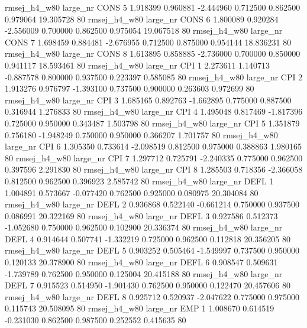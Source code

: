 rmsej_h4_w80   large_nr     CONS                 5  1.918399  0.960881  -2.444960 0.712500 0.862500  0.979064   19.305728 80
rmsej_h4_w80   large_nr     CONS                 6  1.800089  0.920284  -2.556009 0.700000 0.862500  0.975054   19.067518 80
rmsej_h4_w80   large_nr     CONS                 7  1.698459  0.884481  -2.676955 0.712500 0.875000  0.954144   18.836231 80
rmsej_h4_w80   large_nr     CONS                 8  1.613895  0.858885  -2.736000 0.700000 0.850000  0.941117   18.593461 80
rmsej_h4_w80   large_nr      CPI                 1  2.273611  1.140713  -0.887578 0.800000 0.937500  0.223397    0.585085 80
rmsej_h4_w80   large_nr      CPI                 2  1.913276  0.976797  -1.393100 0.737500 0.900000  0.263603    0.972699 80
rmsej_h4_w80   large_nr      CPI                 3  1.685165  0.892763  -1.662895 0.775000 0.887500  0.316944    1.276833 80
rmsej_h4_w80   large_nr      CPI                 4  1.495048  0.817469  -1.817396 0.725000 0.950000  0.343487    1.503798 80
rmsej_h4_w80   large_nr      CPI                 5  1.351879  0.756180  -1.948249 0.750000 0.950000  0.366207    1.701757 80
rmsej_h4_w80   large_nr      CPI                 6  1.305350  0.733614  -2.098519 0.812500 0.975000  0.388863    1.980165 80
rmsej_h4_w80   large_nr      CPI                 7  1.297712  0.725791  -2.240335 0.775000 0.962500  0.397596    2.291830 80
rmsej_h4_w80   large_nr      CPI                 8  1.285503  0.718356  -2.366058 0.812500 0.962500  0.396923    2.585742 80
rmsej_h4_w80   large_nr     DEFL                 1  1.004891  0.573667  -0.077420 0.762500 0.925000  0.080975   20.304084 80
rmsej_h4_w80   large_nr     DEFL                 2  0.936868  0.522140  -0.661214 0.750000 0.937500  0.086991   20.322169 80
rmsej_h4_w80   large_nr     DEFL                 3  0.927586  0.512373  -1.052680 0.750000 0.962500  0.102900   20.336374 80
rmsej_h4_w80   large_nr     DEFL                 4  0.914644  0.507741  -1.332219 0.725000 0.962500  0.112818   20.356205 80
rmsej_h4_w80   large_nr     DEFL                 5  0.903252  0.505464  -1.549997 0.737500 0.950000  0.120133   20.378900 80
rmsej_h4_w80   large_nr     DEFL                 6  0.908547  0.509631  -1.739789 0.762500 0.950000  0.125004   20.415188 80
rmsej_h4_w80   large_nr     DEFL                 7  0.915523  0.514950  -1.901430 0.762500 0.950000  0.122470   20.457606 80
rmsej_h4_w80   large_nr     DEFL                 8  0.925712  0.520937  -2.047622 0.775000 0.975000  0.115743   20.508095 80
rmsej_h4_w80   large_nr      EMP                 1  1.008670  0.614519  -0.231030 0.862500 0.987500  0.252552    0.415635 80
